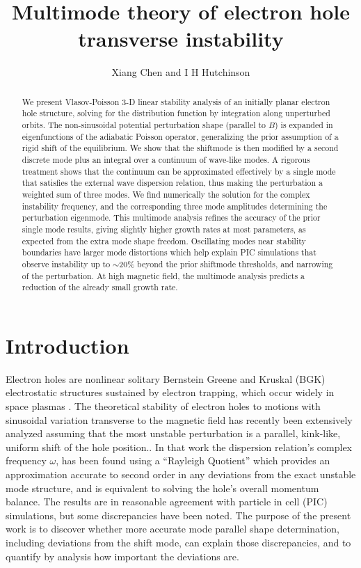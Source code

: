\documentclass[12pt]{article}
\title{Multimode theory of electron hole transverse instability}
\author{Xiang Chen and I H Hutchinson}
\begin{document}
\maketitle

\begin{abstract}
  We present Vlasov-Poisson 3-D linear stability analysis of an initially
  planar electron hole structure, solving for the distribution
  function by integration along unperturbed orbits. The non-sinusoidal
  potential perturbation shape (parallel to $B$) is expanded in
  eigenfunctions of the adiabatic Poisson operator, generalizing the
  prior assumption of a rigid shift of the equilibrium.  We show that
  the shiftmode is then modified by a second discrete mode plus an
  integral over a continuum of wave-like modes. A rigorous treatment
  shows that the continuum can be approximated effectively by a single
  mode that satisfies the external wave dispersion relation, thus
  making the perturbation a weighted sum of three modes. We find
  numerically the solution for the complex instability frequency, and
  the corresponding three mode amplitudes determining the perturbation
  eigenmode. This multimode analysis refines the accuracy of the prior
  single mode results, giving slightly higher growth rates at most
  parameters, as expected from the extra mode shape
  freedom. Oscillating modes near stability boundaries have larger
  mode distortions which help explain PIC simulations that observe
  instability up to $\sim20$\% beyond the prior shiftmode thresholds,
  and narrowing of the perturbation. At high magnetic field, the
  multimode analysis predicts a reduction of the already small growth rate.
\end{abstract}

\section{Introduction}

Electron holes are nonlinear solitary Bernstein Greene and Kruskal
(BGK) electrostatic structures sustained by electron
trapping\cite{Hutchinson2017}, which occur widely in space plasmas
\cite[for a recent summary of observations see e.g.][and references
therein]{Lotekar2020}.  The theoretical stability of electron holes to
motions with sinusoidal variation transverse to the magnetic field has
recently been extensively analyzed assuming that the most unstable
perturbation is a parallel, kink-like, uniform shift of the hole
position.\cite{Hutchinson2018,Hutchinson2018a,Hutchinson2019,Hutchinson2019a,Hutchinson2021d}. In
that work the dispersion relation's complex frequency $\omega$, has
been found using a ``Rayleigh Quotient''\cite{Parlett1974} which
provides an approximation accurate to second order in any deviations
from the exact unstable mode structure, and is equivalent to solving
the hole's overall momentum balance\cite{Hutchinson2016}. The results
are in reasonable agreement with particle in cell (PIC) simulations,
but some discrepancies have been noted. The purpose of the present
work is to discover whether more accurate mode parallel shape
determination, including deviations from the shift mode, can explain
those discrepancies, and to quantify by analysis how important the
deviations are.
\end{document}
